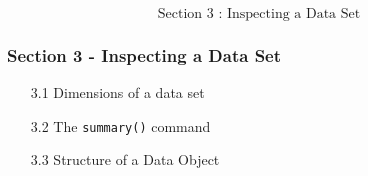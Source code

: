 \documentclass{beamer}
\begin{document}
 	\begin{frame}
 		\Huge
 		\[\mbox{ Section 3 : Inspecting a Data Set } \]
 	\end{frame}
 	\begin{frame}
 		\frametitle{Section 3 - Inspecting a Data Set }
 		\begin{itemize}
 			\item[3.1] Dimensions of a data set 
 			\item[3.2] The \texttt{summary()} command   
 			\item[3.3] Structure of a Data Object 
 		\end{itemize}
 	\end{frame}
 	
\end{document}
